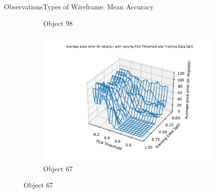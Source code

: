 \documentclass[aspectratio=169, handout, 10pt, hyperref=colorlinks]{beamer}
\begin{document}
\begin{frame}{Observations}{Types of Wireframe: Mean Accuracy}
\begin{figure}
\begin{subfigure}{0.32\linewidth}
            \caption{Object 98}
        \end{subfigure}
        \begin{subfigure}{0.32\linewidth}
            \centering
            \includegraphics[width=1.2\linewidth]{wireframe/error/67.pdf}
            \caption{Object 67}
        \end{subfigure}
        
    \end{figure}
\end{frame}
\end{document}
